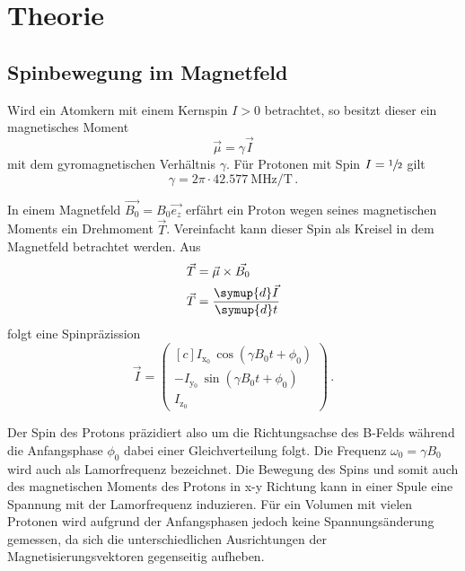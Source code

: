 \section{Theorie}

\subsection{Spinbewegung im Magnetfeld}

Wird ein Atomkern mit einem Kernspin $I>0$ betrachtet, so besitzt dieser ein magnetisches Moment
\begin{equation*}
  \vec{\mu} = \gamma \vec{I}
\end{equation*}
mit dem gyromagnetischen Verhältnis $\gamma$.
Für Protonen mit Spin $I = \sfrac{1}{2}$ gilt
\begin{equation*}
  \gamma = 2 \pi \cdot \SI{42.577}{\mega\hertz\per\tesla}\,. %
\end{equation*}

In einem Magnetfeld $\vec{B_0} = B_0 \vec{e_z}$ erfährt ein Proton wegen seines magnetischen Moments ein Drehmoment $\vec{T}$.
Vereinfacht kann dieser Spin als Kreisel in dem Magnetfeld betrachtet werden.
Aus
\begin{align*}
  \vec{T} &= \vec{\mu} \times \vec{B_0}  \\
  \vec{T} &= \frac{\symup{d}\vec{I}}{\symup{d}t}
\end{align*}
folgt eine Spinpräzission
\begin{equation}
  \vec{I} =
  \begin{pmatrix*}[c]
    I_{\text{x$_0$}} \, \cos(\gamma B_0 t + \phi_0) \\
    -I_{\text{y$_0$}} \, \sin(\gamma B_0 t + \phi_0) \\
    I_{\text{z$_0$}}
\end{pmatrix*}
 \, .
\end{equation}

Der Spin des Protons präzidiert also um die Richtungsachse des B-Felds während die Anfangsphase $\phi_0$ dabei einer Gleichverteilung folgt.
Die Frequenz $\omega_0 = \gamma B_0$ wird auch als Lamorfrequenz bezeichnet.
Die Bewegung des Spins und somit auch des magnetischen Moments des Protons in x-y Richtung kann in einer Spule eine Spannung mit der Lamorfrequenz induzieren.
Für ein Volumen mit vielen Protonen wird aufgrund der Anfangsphasen jedoch keine Spannungsänderung gemessen, da sich die unterschiedlichen 
Ausrichtungen der Magnetisierungsvektoren gegenseitig aufheben.


